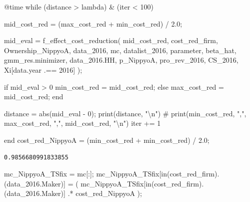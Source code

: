 \documentclass[
  letterpaper,
  DIV=11,
  numbers=noendperiod]{scrreprt}
\newenvironment{Shaded}{\begin{snugshade}}{\end{snugshade}}
\newcommand{\CommentTok}[1]{\textcolor[rgb]{0.37,0.37,0.37}{#1}}
\newcommand{\ControlFlowTok}[1]{\textcolor[rgb]{0.00,0.23,0.31}{#1}}
\newcommand{\FloatTok}[1]{\textcolor[rgb]{0.68,0.00,0.00}{#1}}
\newcommand{\FunctionTok}[1]{\textcolor[rgb]{0.28,0.35,0.67}{#1}}
\newcommand{\NormalTok}[1]{\textcolor[rgb]{0.00,0.23,0.31}{#1}}
\newcommand{\OperatorTok}[1]{\textcolor[rgb]{0.37,0.37,0.37}{#1}}
\newcommand{\PreprocessorTok}[1]{\textcolor[rgb]{0.68,0.00,0.00}{#1}}
\newcommand{\SpecialCharTok}[1]{\textcolor[rgb]{0.37,0.37,0.37}{#1}}
\newcommand{\StringTok}[1]{\textcolor[rgb]{0.13,0.47,0.30}{#1}}
\begin{document}
\begin{Shaded}
\begin{Highlighting}[]
\PreprocessorTok{@time} \ControlFlowTok{while}\NormalTok{ (distance }\OperatorTok{\textgreater{}}\NormalTok{ lambda) }\OperatorTok{\&}\NormalTok{ (iter }\OperatorTok{\textless{}} \FloatTok{100}\NormalTok{)}
    
\NormalTok{    mid\_cost\_red }\OperatorTok{=}\NormalTok{ (max\_cost\_red }\OperatorTok{+}\NormalTok{ min\_cost\_red) }\OperatorTok{/} \FloatTok{2.0}\NormalTok{;}
    
\NormalTok{    mid\_eval }\OperatorTok{=} \FunctionTok{f\_effect\_cost\_reduction}\NormalTok{(}
\NormalTok{        mid\_cost\_red,}
\NormalTok{        cost\_red\_firm,}
\NormalTok{        Ownership\_NippyoA,}
\NormalTok{        data\_2016,}
\NormalTok{        mc,}
\NormalTok{        datalist\_2016,}
\NormalTok{        parameter,}
\NormalTok{        beta\_hat,}
\NormalTok{        gmm\_res.minimizer,}
\NormalTok{        data\_2016.HH,}
\NormalTok{        p\_NippyoA,}
\NormalTok{        pro\_rev\_2016,}
\NormalTok{        CS\_2016,}
\NormalTok{        Xi[data.year }\OperatorTok{.==} \FloatTok{2016}\NormalTok{]}
\NormalTok{    );}
    
    \ControlFlowTok{if}\NormalTok{ mid\_eval }\OperatorTok{\textgreater{}} \FloatTok{0}
\NormalTok{        min\_cost\_red }\OperatorTok{=}\NormalTok{ mid\_cost\_red;}
    \ControlFlowTok{else}
\NormalTok{        max\_cost\_red }\OperatorTok{=}\NormalTok{ mid\_cost\_red;}
    \ControlFlowTok{end}
    
\NormalTok{    distance }\OperatorTok{=} \FunctionTok{abs}\NormalTok{(mid\_eval }\OperatorTok{{-}} \FloatTok{0}\NormalTok{);}
    \FunctionTok{print}\NormalTok{(distance, }\StringTok{"}\SpecialCharTok{\textbackslash{}n}\StringTok{"}\NormalTok{)}
\CommentTok{\#     print(min\_cost\_red, ",", max\_cost\_red, ",", mid\_cost\_red, "\textbackslash{}n")}
\NormalTok{    iter }\OperatorTok{+=} \FloatTok{1}
    
\ControlFlowTok{end}
\NormalTok{cost\_red\_NippyoA }\OperatorTok{=}\NormalTok{ (min\_cost\_red }\OperatorTok{+}\NormalTok{ min\_cost\_red) }\OperatorTok{/} \FloatTok{2.0}\NormalTok{;}
\end{Highlighting}
\end{Shaded}

\begin{verbatim}
0.9856680991833855
\end{verbatim}

\begin{Shaded}
\begin{Highlighting}[]
\NormalTok{mc\_NippyoA\_TSfix }\OperatorTok{=}\NormalTok{ mc[}\OperatorTok{:}\NormalTok{];}
\NormalTok{mc\_NippyoA\_TSfix[}\FunctionTok{in}\NormalTok{(cost\_red\_firm).(data\_2016.Maker)] }\OperatorTok{=}\NormalTok{ (}
\NormalTok{    mc\_NippyoA\_TSfix[}\FunctionTok{in}\NormalTok{(cost\_red\_firm).(data\_2016.Maker)] }\OperatorTok{.*}\NormalTok{ cost\_red\_NippyoA}
\NormalTok{    );}
\end{Highlighting}
\end{Shaded}
\end{document}
